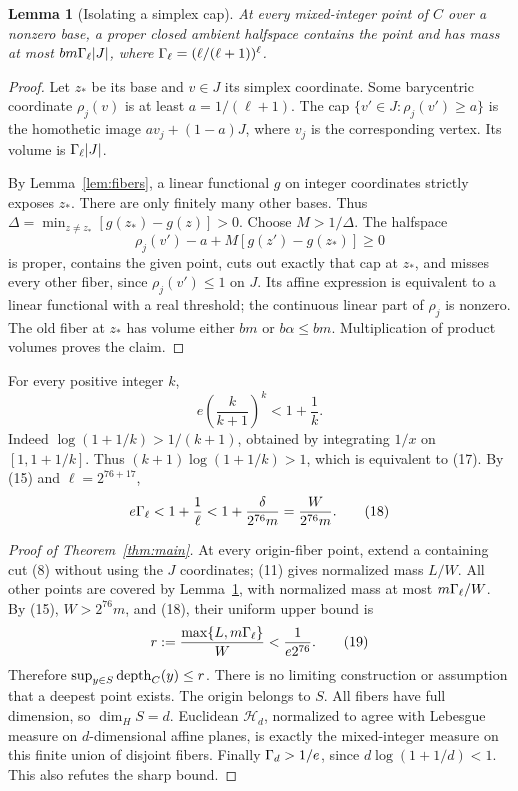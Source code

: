 \documentclass[10pt,letterpaper]{article}
\newtheorem{lemma}{Lemma}
\begin{document}
\begin{lemma}[Isolating a simplex cap]\label{lem:padding}
At every mixed-integer point of $C$ over a nonzero base, a proper closed ambient
halfspace contains the point and has mass at most $bm\Gamma_\ell|J|$, where
$\Gamma_\ell=(\ell/(\ell+1))^\ell$.
\end{lemma}
\begin{proof}
Let $z_*$ be its base and $v\in J$ its simplex coordinate. Some barycentric
coordinate $\rho_j(v)$ is at least $a=1/(\ell+1)$. The cap
$\{v'\in J:\rho_j(v')\ge a\}$ is the homothetic image
$a v_j+(1-a)J$, where $v_j$ is the corresponding vertex. Its volume is
$\Gamma_\ell|J|$.

By Lemma~\ref{lem:fibers}, a linear functional $g$ on integer coordinates
strictly exposes $z_*$. There are only finitely many other bases. Thus
$\Delta=\min_{z\ne z_*}[g(z_*)-g(z)]>0$. Choose $M>1/\Delta$. The halfspace
\[
        \rho_j(v')-a+M[g(z')-g(z_*)]\ge0\tag{16}
\]
is proper, contains the given point, cuts out exactly that cap at $z_*$, and
misses every other fiber, since $\rho_j(v')\le1$ on $J$.
Its affine expression is equivalent to a linear functional with a real
threshold; the continuous linear part of $\rho_j$ is nonzero.
The old fiber at $z_*$ has volume either $bm$ or $b\alpha\le bm$.
Multiplication of product volumes proves the claim.
\end{proof}

For every positive integer $k$,
\[
                  e\left(\frac{k}{k+1}\right)^k<1+\frac1k.\tag{17}
\]
Indeed $\log(1+1/k)>1/(k+1)$, obtained by integrating $1/x$ on
$[1,1+1/k]$. Thus $(k+1)\log(1+1/k)>1$, which is equivalent to (17).
By (15) and $\ell=2^{76+17}$,
\[
       e\Gamma_\ell<1+\frac1\ell
       <1+\frac{\delta}{2^{76}m}=\frac{W}{2^{76}m}.\tag{18}
\]

\begin{proof}[Proof of Theorem~\ref{thm:main}]
At every origin-fiber point, extend a containing cut (8) without using the
$J$ coordinates; (11) gives normalized mass $L/W$. All other points are
covered by Lemma~\ref{lem:padding}, with normalized mass at most
$m\Gamma_\ell/W$. By (15), $W>2^{76}m$, and (18), their uniform upper bound is
\[
       r:=\frac{\max\{L,m\Gamma_\ell\}}{W}<\frac1{e2^{76}}.\tag{19}
\]
Therefore $\sup_{y\in S}\operatorname{depth}_C(y)\le r$. There is no limiting construction
or assumption that a deepest point exists. The origin belongs to $S$.
All fibers have full dimension, so $\dim_H S=d$. Euclidean $\mathcal H_d$,
normalized to agree with Lebesgue measure on $d$-dimensional affine planes,
is exactly the mixed-integer measure on this finite union of disjoint fibers. Finally
$\Gamma_d>1/e$, since $d\log(1+1/d)<1$. This also refutes the sharp bound.
\end{proof}
\end{document}
